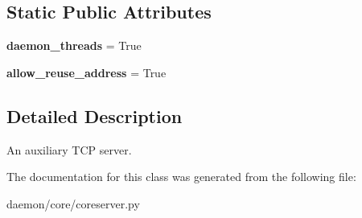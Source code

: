 \subsection*{Static Public Attributes}
\begin{DoxyCompactItemize}
\item 
\hypertarget{classcore_1_1coreserver_1_1_core_aux_server_a6f3fb666769c1da97ed04a761db53bc5}{{\bfseries daemon\+\_\+threads} = True}\label{classcore_1_1coreserver_1_1_core_aux_server_a6f3fb666769c1da97ed04a761db53bc5}

\item 
\hypertarget{classcore_1_1coreserver_1_1_core_aux_server_ad5c52cb368b33d6aa9ff25bb547796e3}{{\bfseries allow\+\_\+reuse\+\_\+address} = True}\label{classcore_1_1coreserver_1_1_core_aux_server_ad5c52cb368b33d6aa9ff25bb547796e3}

\end{DoxyCompactItemize}


\subsection{Detailed Description}
\begin{DoxyVerb}An auxiliary TCP server.
\end{DoxyVerb}
 

The documentation for this class was generated from the following file\+:\begin{DoxyCompactItemize}
\item 
daemon/core/coreserver.\+py\end{DoxyCompactItemize}
